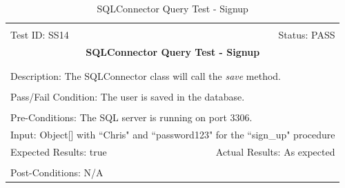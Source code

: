 \documentclass[11pt]{article}
\begin{document}
\begin{center}
\begin{table}[H]
\begin{tabular}{|l r|}\hline&\\[-2mm]
	Test ID: SS14	&Status: PASS\\[-3mm]
	\multicolumn{2}{|c|}{\textbf{\large{SQLConnector Query Test - Signup}}}\\&\\\hline&\\[-3mm]
	\multicolumn{2}{|p{\textwidth}|}{Description: The SQLConnector class will call the \textit{save} method.}\\[1mm]\hline&\\[-3mm]
	\multicolumn{2}{|p{\textwidth}|}{Pass/Fail Condition: The user is saved in the database.}\\[1mm]\hline&\\[-3mm]
	\multicolumn{2}{|p{\textwidth}|}{Pre-Conditions: The SQL server is running on port 3306.}\\[4mm]
	\multicolumn{2}{|p{\textwidth}|}{Input: Object[] with ``Chris" and ``password123" for the ``sign\_up" procedure}\\[2mm]\hline
	\multicolumn{1}{|p{0.49\textwidth}}{Expected Results: true}	&\multicolumn{1}{|p{0.45\textwidth}|}{Actual Results: As expected}\\\hline&\\[-3mm]
	\multicolumn{2}{|p{\textwidth}|}{Post-Conditions: N/A}\\\hline
\end{tabular}
\caption{SQLConnector Query Test - Signup}
\end{table}
\end{center}
\end{document}
